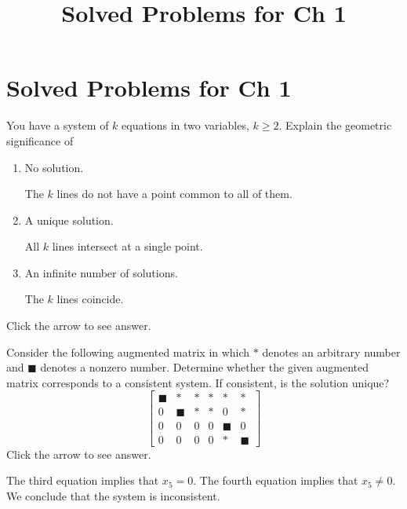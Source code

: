 \documentclass{ximera}
\title{Solved Problems for Ch 1} \license{CC BY-NC-SA 4.0}
\begin{document}
\begin{abstract}
\end{abstract}
\maketitle

\section*{Solved Problems for Ch 1}


\begin{problem}\label{prb:2.3} You have a system of $k$ equations in two variables, $k\geq 2$.
Explain the geometric significance of

\begin{enumerate}
\item No solution.

\begin{expandable}
    The $k$ lines do not have a point common to all of them.
\end{expandable}
\item A unique solution.

\begin{expandable}
    All $k$ lines intersect at a single point.
\end{expandable}
\item An infinite number of solutions.

\begin{expandable}
    The $k$ lines coincide.
\end{expandable}
\end{enumerate}
Click the arrow to see answer.

\end{problem}

\begin{problem}\label{prb:2.7}
Consider the following augmented matrix in which $\ast $ denotes an arbitrary
number and $\blacksquare $ denotes a nonzero number. Determine whether the
given augmented matrix corresponds to a consistent system. If consistent, is the solution unique?
\begin{equation*}
\left[
\begin{array}{ccccc|c}
\blacksquare & \ast & \ast & \ast & \ast & \ast \\
0 & \blacksquare & \ast & \ast & 0 & \ast \\
0 & 0 & 0 & 0 & \blacksquare & 0 \\
0 & 0 & 0 & 0 & \ast & \blacksquare
\end{array}
\right]
\end{equation*}
Click the arrow to see answer. 
\begin{expandable}
The third equation implies that $x_5 = 0$.  The fourth equation implies that $x_5 \ne 0$.  We conclude that the system is inconsistent.
\end{expandable}
\end{problem}
\end{document}
